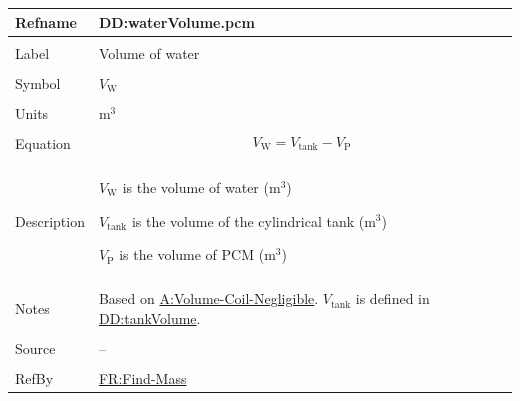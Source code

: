 \documentclass[12pt]{article}
\begin{document}
\vspace{\baselineskip}
\noindent
\begin{minipage}{\textwidth}
\begin{tabular}{>{\raggedright}p{}>{\raggedright\arraybackslash}p{}}
\toprule \textbf{Refname} & \textbf{DD:waterVolume.pcm}
\label{DD:waterVolume.pcm}
\\ \midrule \\
Label & Volume of water
        
\\ \midrule \\
Symbol & ${V_{\text{W}}}$
         
\\ \midrule \\
Units & ${\text{m}^{3}}$
        
\\ \midrule \\
Equation & \begin{displaymath}
           {V_{\text{W}}}={V_{\text{tank}}}-{V_{\text{P}}}
           \end{displaymath}
\\ \midrule \\
Description & \begin{symbDescription}
              \item{${V_{\text{W}}}$ is the volume of water (${\text{m}^{3}}$)}
              \item{${V_{\text{tank}}}$ is the volume of the cylindrical tank (${\text{m}^{3}}$)}
              \item{${V_{\text{P}}}$ is the volume of PCM (${\text{m}^{3}}$)}
              \end{symbDescription}
\\ \midrule \\
Notes & Based on \hyperref[assumpVCN]{A:Volume-Coil-Negligible}. ${V_{\text{tank}}}$ is defined in \hyperref[DD:tankVolume]{DD:tankVolume}.
        
\\ \midrule \\
Source & --
         
\\ \midrule \\
RefBy & \hyperref[findMass]{FR:Find-Mass}
        
\\ \bottomrule
\end{tabular}
\end{minipage}
\end{document}
